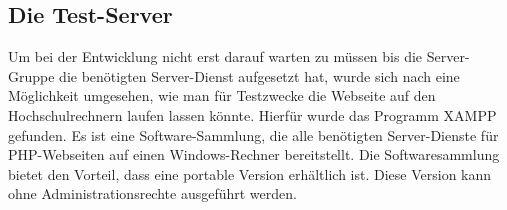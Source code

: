 \subsection{Die Test-Server}
Um bei der Entwicklung nicht erst darauf warten zu müssen bis die Server-Gruppe die benötigten Server-Dienst aufgesetzt hat, wurde sich nach eine Möglichkeit umgesehen, wie man für Testzwecke die Webseite auf den Hochschulrechnern laufen lassen könnte. Hierfür wurde das Programm XAMPP gefunden. Es ist eine Software-Sammlung, die alle benötigten Server-Dienste für PHP-Webseiten auf einen Windows-Rechner bereitstellt. Die Softwaresammlung bietet den Vorteil, dass eine portable Version erhältlich ist. Diese Version kann ohne Administrationsrechte ausgeführt werden.
